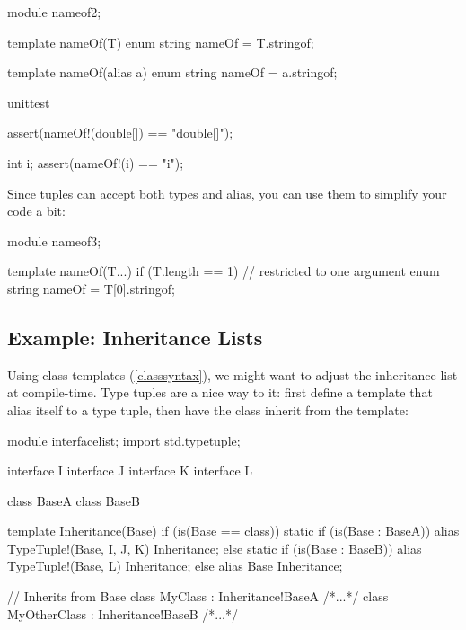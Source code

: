 \begin{dcode}
module nameof2;

template nameOf(T)
{
    enum string nameOf = T.stringof;
}

template nameOf(alias a)
{
    enum string nameOf = a.stringof;
}

unittest
{
    assert(nameOf!(double[]) == "double[]");

    int i;
    assert(nameOf!(i) == "i");
}
\end{dcode}

Since tuples can accept both types and alias, you can use them to simplify your code a bit:

\begin{dcode}
module nameof3;

template nameOf(T...) if (T.length == 1) // restricted to one argument
{
    enum string nameOf = T[0].stringof;
}
\end{dcode}


\subsection{Example: Inheritance Lists}\label{inheritancelist}


Using class templates (\ref{classsyntax}), we might want to adjust the inheritance list at compile-time. Type tuples are a nice way to it: first define a template that alias itself to a type tuple, then have the class inherit from the template:

\begin{dcode}
module interfacelist;
import std.typetuple;

interface I {}
interface J {}
interface K {}
interface L {}

class BaseA {}
class BaseB {}

template Inheritance(Base) if (is(Base == class))
{
    static if (is(Base : BaseA))
        alias TypeTuple!(Base, I, J, K) Inheritance;
    else static if (is(Base : BaseB))
        alias TypeTuple!(Base, L)       Inheritance;
    else
        alias Base                      Inheritance;
}

// Inherits from Base
class MyClass : Inheritance!BaseA { /*...*/ }
class MyOtherClass : Inheritance!BaseB { /*...*/ }
\end{dcode}

